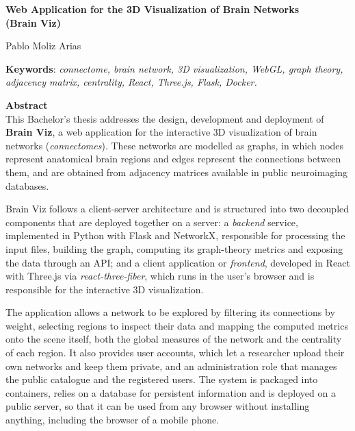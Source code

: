 \cleardoublepage

\thispagestyle{empty}

\begin{center}
	{\large\bfseries Web Application for the 3D Visualization of Brain Networks \\ \textnormal{\normalsize (Brain Viz)} }\\
\end{center}
\begin{center}
	Pablo Moliz Arias\\
\end{center}
\vspace{0.5cm}
\noindent\textbf{Keywords}: \textit{connectome, brain network, 3D visualization, WebGL, graph
theory, adjacency matrix, centrality, React, Three.js, Flask, Docker.}
\vspace{0.7cm}

\noindent\textbf{Abstract}\\
This Bachelor's thesis addresses the design, development and deployment of \textbf{Brain Viz}, a web
application for the interactive 3D visualization of brain networks (\textit{connectomes}). These
networks are modelled as graphs, in which nodes represent anatomical brain regions and edges
represent the connections between them, and are obtained from adjacency matrices available in public
neuroimaging databases.

Brain Viz follows a client-server architecture and is structured into two decoupled components that
are deployed together on a server: a \textit{backend} service, implemented in Python with Flask and
NetworkX, responsible for processing the input files, building the graph, computing its graph-theory
metrics and exposing the data through an API; and a client application or \textit{frontend},
developed in React with Three.js via \textit{react-three-fiber}, which runs in the user's browser
and is responsible for the interactive 3D visualization.

The application allows a network to be explored by filtering its connections by weight, selecting
regions to inspect their data and mapping the computed metrics onto the scene itself, both the
global measures of the network and the centrality of each region. It also provides user accounts,
which let a researcher upload their own networks and keep them private, and an administration role
that manages the public catalogue and the registered users. The system is packaged into containers,
relies on a database for persistent information and is deployed on a public server, so that it can
be used from any browser without installing anything, including the browser of a mobile phone.

